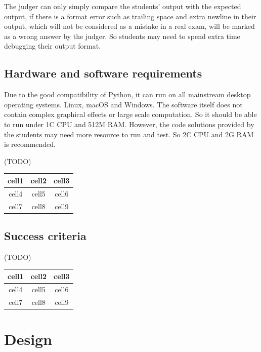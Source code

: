 \documentclass[a4paper]{report}
\begin{document}
The judger can only simply compare the students' output with the expected output, if there is a format error such as trailing space and extra newline in their output, which will not be considered as a mistake in a real exam, will be marked as a wrong answer by the judger. So students may need to spend extra time debugging their output format.

\section{Hardware and software requirements}

Due to the good compatibility of Python, it can run on all mainstream desktop operating systems. Linux, macOS and Windows. The software itself does not contain complex graphical effects or large scale computation. So it should be able to run under 1C CPU and 512M RAM. However, the code solutions provided by the students may need more resource to run and test. So 2C CPU and 2G RAM is recommended.

(TODO)

\begin{center}
    \begin{tabular}{ |c|c|c| }
        \hline
        cell1 & cell2 & cell3 \\
        \hline
        cell4 & cell5 & cell6 \\
        \hline
        cell7 & cell8 & cell9 \\
        \hline
    \end{tabular}
\end{center}

\section{Success criteria}

(TODO)

\begin{center}
    \begin{tabular}{ |c|c|c| }
        \hline
        cell1 & cell2 & cell3 \\
        \hline
        cell4 & cell5 & cell6 \\
        \hline
        cell7 & cell8 & cell9 \\
        \hline
    \end{tabular}
\end{center}


\chapter{Design}
\end{document}
